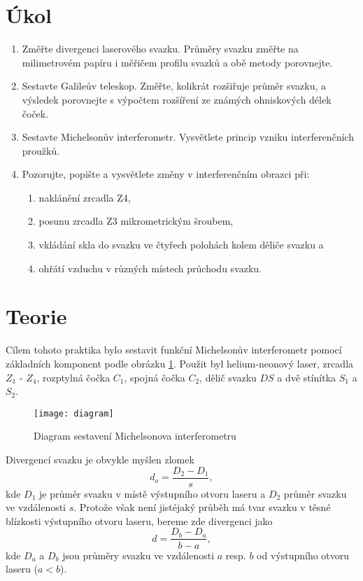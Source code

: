 \documentclass{protokol}
\begin{document}
  \section*{Úkol}

    \begin{enumerate}
      \item Změřte divergenci laserového svazku. Průměry svazku změřte na milimetrovém papíru i měřičem profilu svazků a obě metody porovnejte.
      \item Sestavte Galileův teleskop. Změřte, kolikrát rozšiřuje průměr svazku, a výsledek porovnejte s výpočtem rozšíření ze známých ohniskových délek čoček.
      \item Sestavte Michelsonův interferometr. Vysvětlete princip vzniku interferenčních proužků.
      \item Pozorujte, popište a vysvětlete změny v interferenčním obrazci při:
      \begin{enumerate}
        \item naklánění zrcadla Z4,
        \item posunu zrcadla Z3 mikrometrickým šroubem,
        \item vkládání skla do svazku ve čtyřech polohách kolem děliče svazku a
        \item ohřátí vzduchu v různých místech průchodu svazku.
      \end{enumerate}
    \end{enumerate}

  \section*{Teorie}

    Cílem tohoto praktika bylo sestavit funkční Michelsonův interferometr pomocí základních komponent podle obrázku \ref{fig:diagram}. Použit byl helium-neonový laser, zrcadla $Z_1$ - $Z_4$, rozptylná čočka $C_1$, spojná čočka $C_2$, dělič svazku $DS$ a dvě stínítka $S_1$ a $S_2$.
    
    \begin{figure}[H]
      \centering
      \texttt{[image: diagram]}
      \caption{Diagram sestavení Michelsonova interferometru}
      \label{fig:diagram}
    \end{figure}
    
    Divergencí svazku je obvykle myšlen zlomek
    \begin{equation}
      d_o = \frac{D_2-D_1}{s},
    \end{equation}
    kde $D_1$ je průměr svazku v místě výstupního otvoru laseru a $D_2$ průměr svazku ve vzdálenosti $s$. Protože však není jistéjaký průběh má tvar svazku v těsné blízkosti výstupního otvoru laseru, bereme zde divergenci jako 
    \begin{equation} \label{eq:divergence}
      d = \frac{D_b - D_a}{b-a},
    \end{equation}
    kde $D_a$ a $D_b$ jsou průměry svazku ve vzdálenosti $a$ resp. $b$ od výstupního otvoru laseru ($a < b$).
    
\end{document}
